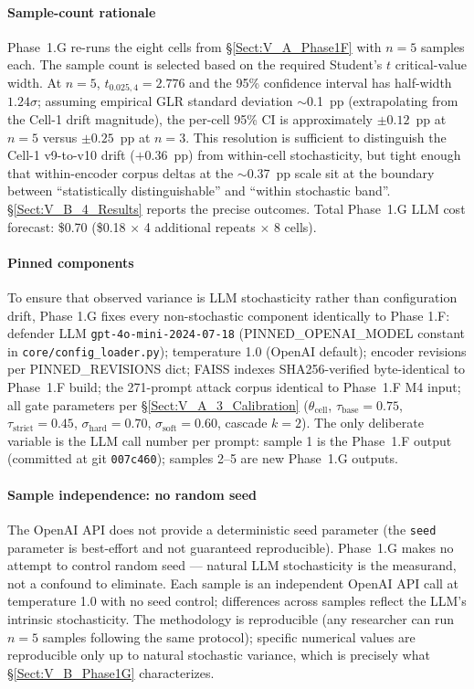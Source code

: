 \documentclass[journal]{IEEEtran}
\begin{document}
\paragraph{Sample-count rationale}
Phase~1.G re-runs the eight cells from \S\ref{Sect:V_A_Phase1F} with $n{=}5$ samples each. The sample count is selected based on the required Student's $t$ critical-value width. At $n{=}5$, $t_{0.025,4}{=}2.776$ and the 95\% confidence interval has half-width $1.24\sigma$; assuming empirical GLR standard deviation $\sim$0.1~pp (extrapolating from the Cell-1 drift magnitude), the per-cell 95\% CI is approximately $\pm0.12$~pp at $n{=}5$ versus $\pm0.25$~pp at $n{=}3$. This resolution is sufficient to distinguish the Cell-1 v9-to-v10 drift ($+0.36$~pp) from within-cell stochasticity, but tight enough that within-encoder corpus deltas at the $\sim$0.37~pp scale sit at the boundary between ``statistically distinguishable'' and ``within stochastic band''. \S\ref{Sect:V_B_4_Results} reports the precise outcomes. Total Phase~1.G LLM cost forecast: \$0.70 (\$0.18 $\times$ 4 additional repeats $\times$ 8 cells).

\paragraph{Pinned components}
To ensure that observed variance is LLM stochasticity rather than configuration drift, Phase 1.G fixes every non-stochastic component identically to Phase 1.F: defender LLM \texttt{gpt-4o-mini-2024-07-18} (PINNED\_OPENAI\_MODEL constant in \texttt{core/config\_loader.py}); temperature 1.0 (OpenAI default); encoder revisions per PINNED\_REVISIONS dict; FAISS indexes SHA256-verified byte-identical to Phase~1.F build; the 271-prompt attack corpus identical to Phase~1.F M4 input; all gate parameters per \S\ref{Sect:V_A_3_Calibration} ($\theta_{\text{cell}}$, $\tau_{\text{base}}{=}0.75$, $\tau_{\text{strict}}{=}0.45$, $\sigma_{\text{hard}}{=}0.70$, $\sigma_{\text{soft}}{=}0.60$, cascade $k{=}2$). The only deliberate variable is the LLM call number per prompt: sample 1 is the Phase~1.F output (committed at git \texttt{007c460}); samples 2--5 are new Phase~1.G outputs.

\paragraph{Sample independence: no random seed}
The OpenAI API does not provide a deterministic seed parameter (the \texttt{seed} parameter is best-effort and not guaranteed reproducible). Phase~1.G makes no attempt to control random seed --- natural LLM stochasticity is the measurand, not a confound to eliminate. Each sample is an independent OpenAI API call at temperature 1.0 with no seed control; differences across samples reflect the LLM's intrinsic stochasticity. The methodology is reproducible (any researcher can run $n{=}5$ samples following the same protocol); specific numerical values are reproducible only up to natural stochastic variance, which is precisely what \S\ref{Sect:V_B_Phase1G} characterizes.
\end{document}
